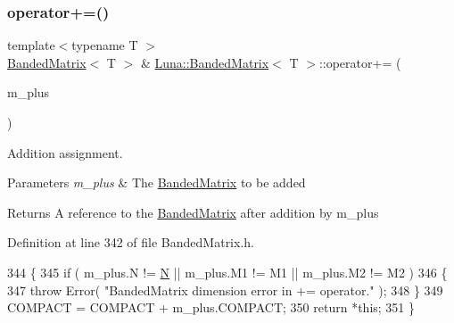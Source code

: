 \subsubsection{\texorpdfstring{operator+=()}{operator+=()}\hspace{0.1cm}{\footnotesize\ttfamily [1/2]}}
{\footnotesize\ttfamily template$<$typename T $>$ \\
\hyperlink{classLuna_1_1BandedMatrix}{Banded\+Matrix}$<$ T $>$ \& \hyperlink{classLuna_1_1BandedMatrix}{Luna\+::\+Banded\+Matrix}$<$ T $>$\+::operator+= (\begin{DoxyParamCaption}\item[{const \hyperlink{classLuna_1_1BandedMatrix}{Banded\+Matrix}$<$ T $>$ \&}]{m\+\_\+plus }\end{DoxyParamCaption})\hspace{0.3cm}{\ttfamily [inline]}}



Addition assignment. 


\begin{DoxyParams}{Parameters}
{\em m\+\_\+plus} & The \hyperlink{classLuna_1_1BandedMatrix}{Banded\+Matrix} to be added \\
\hline
\end{DoxyParams}
\begin{DoxyReturn}{Returns}
A reference to the \hyperlink{classLuna_1_1BandedMatrix}{Banded\+Matrix} after addition by m\+\_\+plus 
\end{DoxyReturn}


Definition at line 342 of file Banded\+Matrix.\+h.


\begin{DoxyCode}
344   \{
345     \textcolor{keywordflow}{if} ( m\_plus.N != \hyperlink{namespaceHeat__plot_a7d050092798e28458a263710837bda77}{N} || m\_plus.M1 != M1 || m\_plus.M2 != M2 )
346     \{
347       \textcolor{keywordflow}{throw} Error( \textcolor{stringliteral}{"BandedMatrix dimension error in += operator."} );
348     \}
349     COMPACT = COMPACT + m\_plus.COMPACT;
350     \textcolor{keywordflow}{return} *\textcolor{keyword}{this};
351   \}
\end{DoxyCode}
\mbox{\label{classLuna_1_1BandedMatrix_a37348fae7fd2ad220be2dad6a232c764}} 
